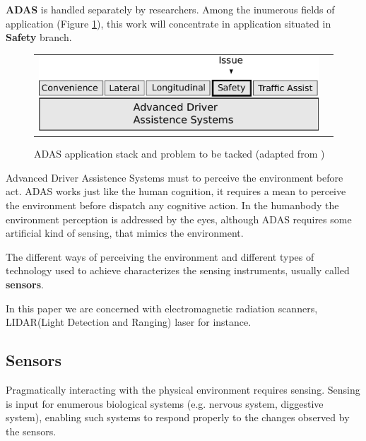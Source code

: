 \textbf{ADAS} is handled separately by researchers. Among the inumerous fields of application (Figure \ref{fig:sensor:target}), this work will concentrate in application situated in \textbf{Safety} branch.

\begin{figure}[h]
\centering
	\begin{tabular}{lr}\\
		\includegraphics[scale=0.7]{img/fig:sensor:target} 
	\end{tabular}
	\caption{ADAS application stack and problem to be tacked (adapted from \cite{riener2010sensor})}
	\label{fig:sensor:target}
\end{figure}

Advanced Driver Assistence Systems must to perceive the environment before act. ADAS works just like the human cognition, it requires a mean to perceive the environment before dispatch any cognitive action. In the humanbody the environment perception is addressed by the eyes, although ADAS requires some artificial kind of sensing, that mimics the environment. 

The different ways of perceiving the environment and different types of technology used to achieve characterizes the sensing instruments, usually called \textbf{sensors}.


In this paper we are concerned with electromagnetic radiation scanners, LIDAR(Light Detection and Ranging) laser for instance.

\subsection{Sensors}


Pragmatically interacting with the physical environment requires sensing. Sensing is input for enumerous biological systems (e.g. nervous system, diggestive system), enabling such systems to respond properly to the changes observed by the sensors. 

